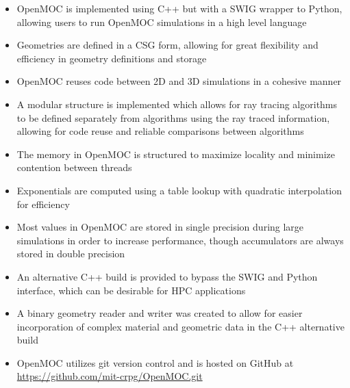\newpage
\vfill
\begin{highlightsbox}[frametitle=Highlights]
	\begin{itemize}
		\item OpenMOC is implemented using C++ but with a \ac{SWIG} wrapper to Python, allowing users to run OpenMOC simulations in a high level language
		\item Geometries are defined in a \ac{CSG} form, allowing for great flexibility and efficiency in geometry definitions and storage
		\item OpenMOC reuses code between 2D and 3D simulations in a cohesive manner
		\item A modular structure is implemented which allows for ray tracing algorithms to be defined separately from algorithms using the ray traced information, allowing for code reuse and reliable comparisons between algorithms
		\item The memory in OpenMOC is structured to maximize locality and minimize contention between threads
		\item Exponentials are computed using a table lookup with quadratic interpolation for efficiency
		\item Most values in OpenMOC are stored in single precision during large simulations in order to increase performance, though accumulators are always stored in double precision
		\item An alternative C++ build is provided to bypass the \ac{SWIG} and Python interface, which can be desirable for \ac{HPC} applications
		\item A binary geometry reader and writer was created to allow for easier incorporation of complex material and geometric data in the C++ alternative build
		\item OpenMOC utilizes git version control and is hosted on GitHub at \url{https://github.com/mit-crpg/OpenMOC.git}
		
	\end{itemize}
\end{highlightsbox}
\vfill